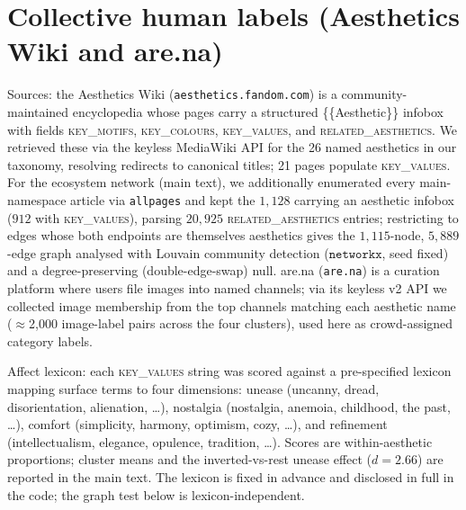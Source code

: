 \documentclass[11pt]{article}
\begin{document}
\section{Collective human labels (Aesthetics Wiki and are.na)}

Sources: the Aesthetics Wiki (\texttt{aesthetics.fandom.com}) is a
community-maintained encyclopedia whose pages carry a structured \{\{Aesthetic\}\} infobox
with fields \textsc{key\_motifs}, \textsc{key\_colours}, \textsc{key\_values}, and
\textsc{related\_aesthetics}. We retrieved these via the keyless MediaWiki API for the 26
named aesthetics in our taxonomy, resolving redirects to canonical titles; 21 pages
populate \textsc{key\_values}. For the ecosystem network (main text), we additionally
enumerated every main-namespace article via \texttt{allpages} and kept the $1{,}128$
carrying an aesthetic infobox ($912$ with \textsc{key\_values}), parsing $20{,}925$
\textsc{related\_aesthetics} entries; restricting to edges whose both endpoints are themselves
aesthetics gives the $1{,}115$-node, $5{,}889$-edge graph analysed with Louvain community
detection ($\texttt{networkx}$, seed fixed) and a degree-preserving (double-edge-swap) null.
are.na (\texttt{are.na}) is a curation platform where users
file images into named channels; via its keyless v2 API we collected image membership from
the top channels matching each aesthetic name ($\approx$2{,}000 image-label pairs across
the four clusters), used here as crowd-assigned category labels.

Affect lexicon: each \textsc{key\_values} string was scored against a
pre-specified lexicon mapping surface terms to four dimensions: unease
(uncanny, dread, disorientation, alienation, \ldots), nostalgia (nostalgia, anemoia,
childhood, the past, \ldots), comfort (simplicity, harmony, optimism, cozy, \ldots),
and refinement (intellectualism, elegance, opulence, tradition, \ldots). Scores are
within-aesthetic proportions; cluster means and the inverted-vs-rest unease effect
($d=2.66$) are reported in the main text. The lexicon is fixed in advance and disclosed in
full in the code; the graph test below is lexicon-independent.
\end{document}
